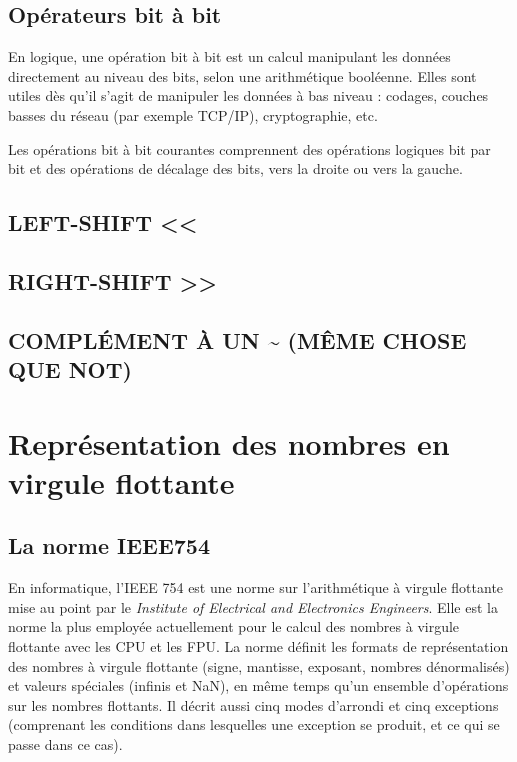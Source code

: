 \documentclass[
  letterpaper,
]{scrbook}
\theoremstyle{definition}
\theoremstyle{definition}
\theoremstyle{plain}
\theoremstyle{remark}
\begin{document}
\hypertarget{opuxe9rateurs-bit-uxe0-bit}{%
\subsection{Opérateurs bit à bit}\label{opuxe9rateurs-bit-uxe0-bit}}

En logique, une opération bit à bit est un calcul manipulant les données
directement au niveau des bits, selon une arithmétique booléenne. Elles
sont utiles dès qu'il s'agit de manipuler les données à bas niveau :
codages, couches basses du réseau (par exemple TCP/IP), cryptographie,
etc.

Les opérations bit à bit courantes comprennent des opérations logiques
bit par bit et des opérations de décalage des bits, vers la droite ou
vers la gauche.

\hypertarget{left-shift}{%
\subsection{LEFT-SHIFT \textless\textless{}}\label{left-shift}}

\hypertarget{right-shift}{%
\subsection{RIGHT-SHIFT \textgreater\textgreater{}}\label{right-shift}}

\hypertarget{compluxe9ment-uxe0-un-muxeame-chose-que-not}{%
\subsection{COMPLÉMENT À UN \textasciitilde{} (MÊME CHOSE QUE
NOT)}\label{compluxe9ment-uxe0-un-muxeame-chose-que-not}}

\hypertarget{repruxe9sentation-des-nombres-en-virgule-flottante}{%
\section{Représentation des nombres en virgule
flottante}\label{repruxe9sentation-des-nombres-en-virgule-flottante}}

\hypertarget{la-norme-ieee754}{%
\subsection{La norme IEEE754}\label{la-norme-ieee754}}

En informatique, l'IEEE 754 est une norme sur l'arithmétique à virgule
flottante mise au point par le \emph{Institute of Electrical and
Electronics Engineers}. Elle est la norme la plus employée actuellement
pour le calcul des nombres à virgule flottante avec les CPU et les FPU.
La norme définit les formats de représentation des nombres à virgule
flottante (signe, mantisse, exposant, nombres dénormalisés) et valeurs
spéciales (infinis et NaN), en même temps qu'un ensemble d'opérations
sur les nombres flottants. Il décrit aussi cinq modes d'arrondi et cinq
exceptions (comprenant les conditions dans lesquelles une exception se
produit, et ce qui se passe dans ce cas).
\end{document}
